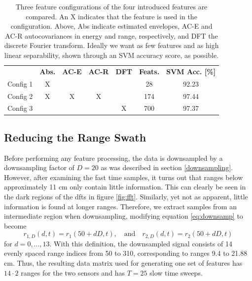 

\begin{table}
\begin{center}
  \begin{tabular}{|c|cccccc|}
\hline
    \rowcolor{gray!150}
		  & \color{white}\textbf{Abs.} & \color{white}\textbf{AC-E} & \color{white}\textbf{AC-R} & \color{white}\textbf{DFT} & \color{white}\textbf{Feats.} & \color{white}\textbf{SVM Acc. [\%]} \\
	  Config 1 & X &   &   &   & 28  & 92.23 \\
	  Config 2 & X & X & X & & 174 & 97.44 \\
	  Config 3 & & & & X & 700 & 97.37 \\
\hline
  \end{tabular}
\end{center}
	\caption{Three feature configurations of the four introduced features are compared. An X indicates that the feature is used in the configuration. Above, Abs indicate estimated envelopes, AC-E and AC-R autocovariances in energy and range, respectively, and DFT the discrete Fourier transform. Ideally we want as few features and as high linear separability, shown through an SVM accuracy score, as possible.} 
\label{tab:feat}
\end{table}



\subsection{Reducing the Range Swath}

Before performing any feature processing, the data is downsampled by a downsampling factor of $D=20$ as was described in section \ref{downsampling}. However, after examining the fast time samples, it turns out that ranges below approximately 11 cm only contain little information. This can clearly be seen in the dark regions of the \gls{dft}s in figure \ref{fig:fft}. Similarly, yet not as apparent, little information is found at longer ranges. Therefore, we extract samples from an intermediate region when downsampling, modifying equation \eqref{eq:downsamp} to become
\begin{equation}
	r_{1,D}(d, t) = r_{1}(50+dD,t), 
	\quad \text{and} \quad r_{2,D}(d,t) = r_{2}(50+dD,t)
\end{equation}
for $d=0,...,13$. With this definition, the downsampled signal consists of 14 evenly spaced range indices from 50 to 310, corresponding to ranges 9.4 to 21.88 cm. Thus, the resulting data matrix used for generating one set of features has $14\cdot 2$ ranges for the two sensors and has $T=25$ slow time sweeps. 


